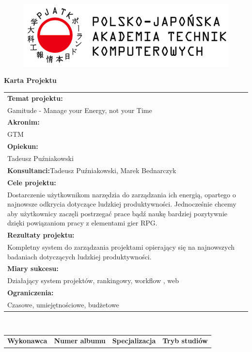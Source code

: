 \documentclass[a4paper,11pt]{report}
\begin{document}
\let\cleardoublepage\clearpage
\begin{figure}[ht]
\centering
\includegraphics{pjatk.png}
\end{figure}
\begin{center}
\textbf{\huge Karta Projektu}\\
\vspace{1cm}
\begin{tabular}{|p{15cm}|}
\hline
\textbf{Temat projektu:}\\Gamitude - Manage your Energy, not your Time\\ 
\hline
\textbf{Akronim:}\\GTM\\
\hline
\textbf{Opiekun:}\\Tadeusz Puźniakowski \\
\hline
\textbf{Konsultanci:}Tadeusz Puźniakowski, Marek Bednarczyk \\
\hline
\textbf{Cele projektu:}\\Dostarczenie użytkownikom narzędzia do zarządzania ich energią, opartego o najnowsze odkrycia dotyczące ludzkiej produktywności. Jednocześnie chcemy aby użytkownicy zaczęli postrzegać prace bądź naukę bardziej pozytywnie dzięki powiązaniom pracy z elementami gier RPG.\\
\hline
\textbf{Rezultaty projektu:}\\Kompletny system do zarządzania projektami opierający się na najnowszych badaniach dotyczących ludzkiej produktywności. \\
\hline
\textbf{Miary sukcesu:}\\Działający system projektów, rankingowy, workflow , web \\
\hline
\textbf{Ograniczenia:}\\Czasowe, umiejętnościowe, budżetowe \\
\hline
\end{tabular}\\
\vspace{1cm}
\begin{tabular}{|l|l|l|l|}
\hline
\textbf{Wykonawca} & \textbf{Numer albumu}& \textbf{Specjalizacja}& \textbf{Tryb studiów} \\

\end{tabular}
\end{center}
\end{document}
